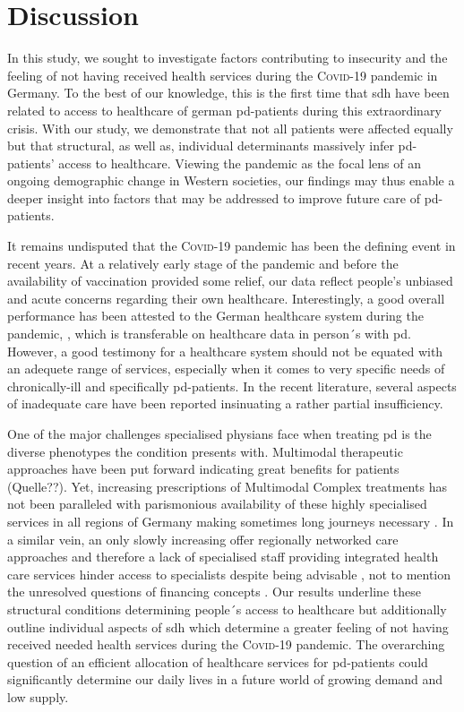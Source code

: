 \documentclass{bmcart}
\begin{document}
\section*{Discussion}
In this study, we sought to investigate factors contributing to insecurity and the feeling of not having received health services during the \textsc{Covid}-19 pandemic in Germany. To the best of our knowledge, this is the first time that \ac{sdh} have been related to access to healthcare of german \ac{pd}-patients during this extraordinary crisis. With our study, we demonstrate that not all patients were affected equally but that structural, as well as, individual determinants massively infer \ac{pd}-patients' access to healthcare. Viewing the pandemic as the focal lens of an ongoing demographic change in Western societies, our findings may thus enable a deeper insight into factors that may be addressed to improve future care of \ac{pd}-patients. 

It remains undisputed that the \textsc{Covid}-19 pandemic has been the defining event in recent years. At a relatively early stage of the pandemic and before the availability of vaccination provided some relief, our data reflect people's unbiased and acute concerns regarding their own healthcare. Interestingly, a good overall performance has been attested to the German healthcare system during the pandemic, \cite{10665-341674}, which is transferable on healthcare data in person´s with \ac{pd}\cite{frundt2022impact}. However, a good testimony for a healthcare system should not be equated with an adequete range of services, especially when it comes to very specific needs of chronically-ill and specifically \ac{pd}-patients. In the recent literature, several aspects of inadequate care have been reported insinuating a rather partial insufficiency.

One of the major challenges specialised physians face when treating \ac{pd} is the diverse phenotypes the condition presents with. Multimodal therapeutic approaches have been put forward indicating great benefits for patients (Quelle??). Yet, increasing prescriptions of Multimodal Complex treatments has not been paralleled with parismonious availability of these highly specialised services in all regions of Germany making sometimes long journeys necessary \cite{richter2019dynamics}. In a similar vein,  an only slowly increasing offer regionally networked care approaches \cite{van2020building} and therefore a lack of specialised staff providing integrated health care services hinder access to specialists despite being advisable \cite{radder2020recommendations}, not to mention the unresolved questions of financing concepts \cite{prell2020specialized} . Our results underline these structural conditions determining people´s access to healthcare but additionally outline individual aspects of \ac{sdh} which determine a greater feeling of not having received needed health services during the \textsc{Covid}-19 pandemic. The overarching question of an efficient allocation of healthcare services for \ac{pd}-patients could significantly determine our daily lives in a future world of growing demand and low supply.
\end{document}
